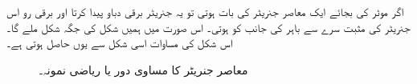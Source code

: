 اگر موٹر کی بجائے ایک معاصر جنریٹر کی بات ہوتی تو یہ جنریٹر برقی دباو پیدا کرتا اور برقی رو اس جنریٹر کی مثبت سرے سے باہر کی جانب کو ہوتی۔ اس صورت میں ہمیں شکل   کی جگہ شکل   ملے گا۔اس شکل کی مساوات اسی شکل سے یوں حاصل ہوتی ہے۔
\begin{figure}
\centering
\caption{معاصر جنریٹر کا مساوی دور یا ریاضی نمونہ۔}
\label{شکل_معاصر_جنریٹر_کا_مساوی_دور}
\end{figure}

